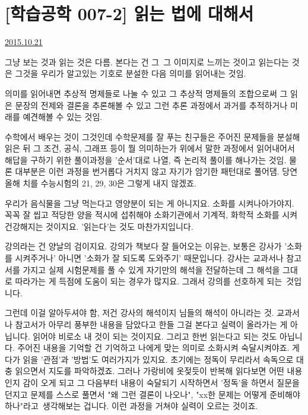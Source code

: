 \section{[학습공학 007-2] 읽는 법에 대해서}
\href{https://www.kockoc.com/Apoc/432733}{2015.10.21}

\vspace{5mm}

그냥 보는 것과 읽는 것은 다름.
본다는 건 그 그 이미지로 느끼는 것이고
읽는다는 것은 그것을 우리가 알고있는 기호로 분설한 다음 의미를 읽어내는 것임.
\vspace{5mm}

의미를 읽어내면 추상적 명제들로 나눌 수 있고
그 추상적 명제들의 조합으로써 그 읽은 문장의 전제와 결론을 추론해볼 수 있고
그런 추론 과정에서 과거를 추적하거나 미래를 예견해볼 수 있는 것임.
\vspace{5mm}

수학에서 배우는 것이 그것인데
수학문제를 잘 푸는 친구들은 주어진 문제들을 분설해 읽은 뒤
그 조건, 공식, 그래프 등이 뭘 의미하는가 위에서 말한 과정에서 읽어내어서
해답을 구하기 위한 풀이과정을 '순서'대로 나열, 즉 논리적 풀이를 해나가는 것임.
물론 대부분은 이런 과정을 번거롭다 거치지 않고 자기가 암기한 패턴대로 풀어댐.
당연 올해 치를 수능시험의 21, 29, 30은 그렇게 내지 않겠죠.
\vspace{5mm}

우리가 음식물을 그냥 먹는다고 영양분이 되는 게 아니지요. 소화를 시켜나아가야지.
꼭꼭 잘 씹고 적당한 양을 적시에 섭취해야 소화기관에서 기계적, 화학적 소화를 시켜 건강해지는 것이지요.
'읽는다'는 것도 마찬가지입니다.
\vspace{5mm}

강의라는 건 양날의 검이지요.
강의가 책보다 잘 들어오는 이유는, 보통은 강사가 '소화를 시켜주거나' 아니면 '소화가 잘 되도록 도와주기' 때문입니다.
강사는 교과서나 참고서를 가지고 실제 시험문제를 풀 수 있게 자기만의 해석을 전달하는데
그 해석을 그대로 따라가는 게 득점에 도움이 되는 경우가 많지요. 그래서 강의를 선호하게 되는 것입니다.
\vspace{5mm}

그런데 이걸 알아두셔야 함, 저건 강사의 해석이지 님들의 해석이 아니라는 것.
교과서나 참고서가 아무리 풍부한 내용을 담았다고 한들 그걸 본다고 실력이 올라가는 게 아닙니다.
읽어야 비로소 내 것이 되는 것이지요.
그리고 한번 읽는다고 되는 것도 아닙니다. 주어진 내용을 기억할 건 기억하고 나에게 맞는 의미로 소화시켜 숙달시켜야죠.
게다가 읽을 '관점'과 '방법'도 여러가지가 있지요.
초기에는 정독이 무리라서 속독으로 대충 읽으면서 지도를 파악하겠죠.
그러나 가랑비에 옷젖듯이 반복해 읽다보면 어떤 내용인지 감이 오게 되고
그 다음부터 내용이 숙달되기 시작하면서 '정독'을 하면서 질문을 던지고 문제를 스스로 풀면서
"왜 그런 결론이 나오나", "xx한 문제는 어떻게 준비해야하나"라고 생각해보는 겁니다.
이런 과정을 거쳐야 실력이 오르는 것이죠.
\vspace{5mm}

